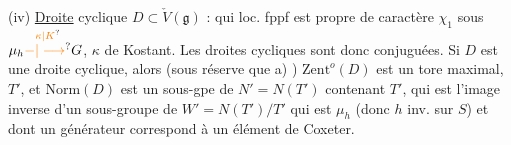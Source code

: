 (iv) \uline{Droite} cyclique $D\subset\check V(\mathfrak g)$ : qui loc. fppf est propre de caractère $\chi_1$ sous $\mu_h\overset{\unsure{\kappa|K}}{\unsure{-|\longrightarrow}}G$, $\kappa$  de Kostant. Les droites cycliques sont donc conjuguées. Si $D$ est une droite cyclique, alors (sous réserve que a) ) $\mathrm{Zent}^{o}(D)$ est un tore maximal, $T'$, et $\mathrm{Norm}(D)$ est un sous-gpe de $N'=N(T')$ contenant $T'$, qui est l'image inverse d'un sous-groupe de $W'=N(T')/T'$ qui est  $\mu_h$ (donc $h$ inv. sur $S$) et dont un générateur correspond à un élément de Coxeter.

